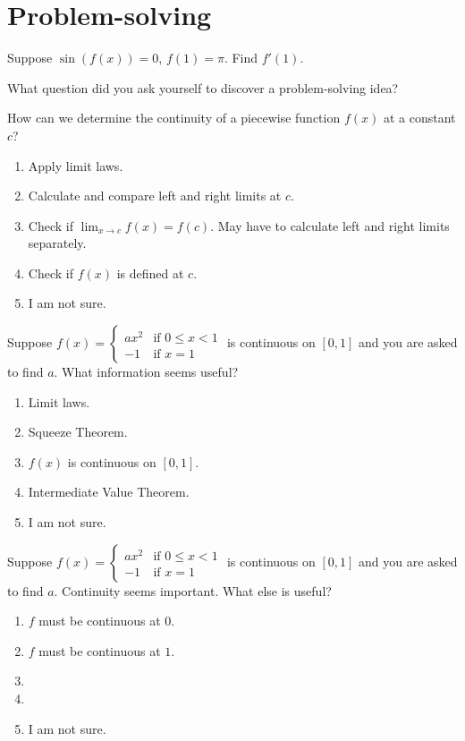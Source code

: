 \documentclass[14pt]{beamer}
\begin{document}
\section{Problem-solving}
\begin{frame}[t]
  Suppose \(\sin(f(x)) = 0\), \(f(1) = \pi\). Find \(f'(1)\).

  What question did you ask yourself to discover a problem-solving idea?
\end{frame}

\begin{frame}[t]
  How can we determine the continuity of a piecewise function \(f(x)\) at a constant \(c\)?

  \medskip
  \begin{enumerate} 
    \item Apply limit laws.
    \item Calculate and compare left and right limits at \(c\).
    \item Check if \(\lim_{x \to c}f(x) = f(c)\). May have to calculate left and right limits separately.
    \item Check if \(f(x)\) is defined at \(c\).
    \item I am not sure.
  \end{enumerate} 
\end{frame}

\begin{frame}[t]
  Suppose \(f(x) = \begin{cases} ax^{2} &\text{if } 0 \le x < 1 \\ -1 &\text{if } x = 1 \end{cases}\) is continuous on \([0,1]\) and you are asked to find \(a\). What information seems useful?

  \medskip
  \begin{enumerate} 
    \item Limit laws.
    \item Squeeze Theorem.
    \item \(f(x)\) is continuous on \([0,1]\).
    \item Intermediate Value Theorem.
    \item I am not sure.
  \end{enumerate} 
\end{frame}

\begin{frame}[t]
  Suppose \(f(x) = \begin{cases} ax^{2} &\text{if } 0 \le x < 1 \\ -1 &\text{if } x = 1 \end{cases}\) is continuous on \([0,1]\) and you are asked to find \(a\). Continuity seems important. What else is useful?

  \medskip
  \begin{enumerate} 
    \item \(f\) must be continuous at \(0\).
    \item \(f\) must be continuous at \(1\).
    \item 
    \item 
    \item I am not sure.
  \end{enumerate} 
\end{frame}
\end{document}

